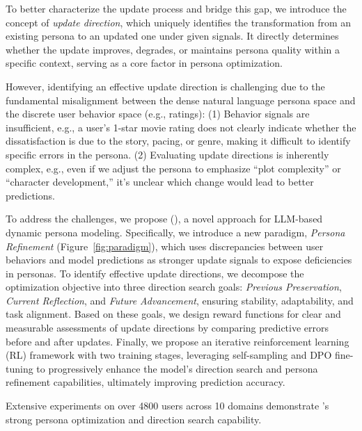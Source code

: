 To better characterize the update process and bridge this gap, we introduce the concept of \textit{update direction}, which uniquely identifies the transformation from an existing persona to an updated one under given signals. It directly determines whether the update improves, degrades, or maintains persona quality within a specific context, serving as a core factor in persona optimization.


However, identifying an effective update direction is challenging due to the fundamental misalignment between the dense natural language persona space and the discrete user behavior space (e.g., ratings):
(1) Behavior signals are insufficient, e.g., a user’s 1-star movie rating does not clearly indicate whether the dissatisfaction is due to the story, pacing, or genre, making it difficult to identify specific errors in the persona.
(2) Evaluating update directions is inherently complex, e.g., even if we adjust the persona to emphasize “plot complexity” or “character development,” it’s unclear which change would lead to better predictions.
















To address the challenges, we propose \textbf{\method} (), a novel approach for LLM-based dynamic persona modeling. 
Specifically, we introduce a new paradigm, \textit{Persona Refinement} (Figure~\ref{fig:paradigm}), which uses discrepancies between user behaviors and model predictions as stronger update signals to expose deficiencies in personas.
To identify effective update directions, we decompose the optimization objective into three direction search goals: \textit{Previous Preservation}, \textit{Current Reflection}, and \textit{Future Advancement}, ensuring stability, adaptability, and task alignment. 
Based on these goals, we design reward functions for clear and measurable assessments of update directions by comparing predictive errors before and after updates.
Finally, we propose an iterative reinforcement learning (RL) framework with two training stages, leveraging self-sampling and DPO fine-tuning to progressively enhance the model’s direction search and persona refinement capabilities, ultimately improving prediction accuracy.


Extensive experiments on over 4800 users across 10 domains demonstrate \method’s strong persona optimization and direction search capability.

